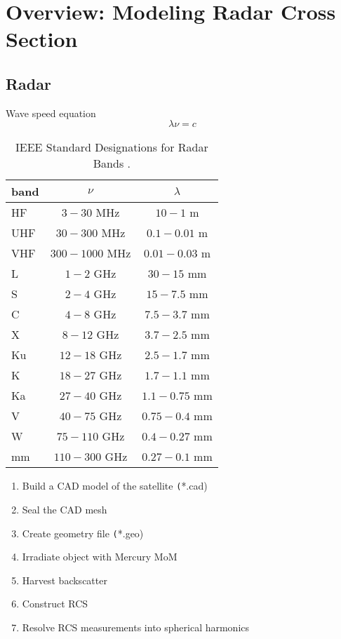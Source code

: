 % 

\section{Overview: Modeling Radar Cross Section}

\subsection{Radar}
Wave speed equation
\begin{equation}
	\lambda \nu = c
\label{eq:wave-speed}
\end{equation}

\begin{table}[htp]
\begin{center}
\begin{tabular}{lcc
}
	band & \multicolumn{1}{c}{$\nu$} & \multicolumn{1}{c}{$\lambda$} \\\hline
	HF & $3-30$ MHz & $10-1$ m\\
	UHF & $30-300$ MHz & $0.1 - 0.01$ m\\
	VHF & $300 - 1000$ MHz & $0.01 - 0.03$ m\\
	L & $1 - 2$ GHz & $30 - 15$ mm \\
	S & $2 - 4$ GHz & $15 - 7.5$ mm  \\
	C & $4 - 8$ GHz & $7.5 - 3.7$ mm  \\
	X & $8 - 12$ GHz & $3.7 - 2.5$ mm  \\
	Ku & $12 - 18$ GHz & $2.5 - 1.7$ mm  \\
	K & $18 - 27$ GHz & $1.7 - 1.1$ mm  \\
	Ka & $27 - 40$ GHz & $1.1 - 0.75$ mm  \\
	V & $40 - 75$ GHz & $0.75 - 0.4$ mm  \\
	W & $75 - 110$ GHz & $0.4 - 0.27$ mm  \\
	mm & $110 - 300$ GHz & $0.27 - 0.1$ mm  \\
\end{tabular}
\caption{IEEE Standard Designations for Radar Bands \cite{bruder2003ieee}.}
\end{center}
\label{tab:wavespeed}
\end{table}%


\begin{enumerate}[label=(\Alph*)]
	\item Build a CAD model of the satellite \texttt(*.cad)
	\item Seal the CAD mesh
	\item Create geometry file \texttt(*.geo)
	\item Irradiate object with Mercury MoM
	\item Harvest backscatter
	\item Construct RCS
	\item Resolve RCS measurements into spherical harmonics
\end{enumerate}

